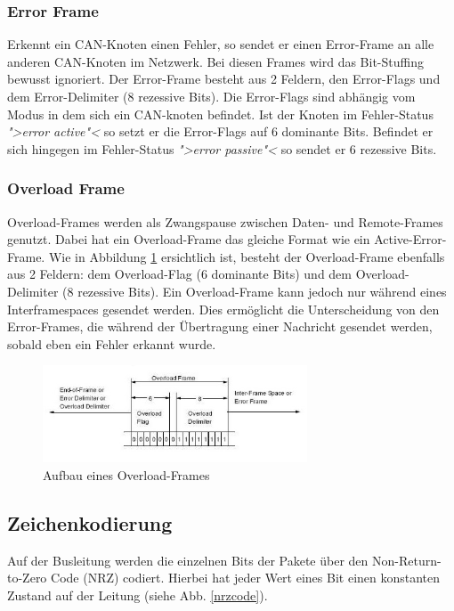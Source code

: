 \subsubsection{Error Frame} Erkennt ein CAN-Knoten einen Fehler, so
sendet er einen Error-Frame an alle anderen CAN-Knoten im Netzwerk.
Bei diesen Frames wird das Bit-Stuffing bewusst ignoriert. Der
Error-Frame besteht aus 2 Feldern, den Error-Flags und dem
Error-Delimiter (8 rezessive Bits). Die Error-Flags sind abhängig vom
Modus in dem sich ein CAN-knoten befindet. Ist der Knoten im
Fehler-Status \textit{">error active"<} so setzt er die Error-Flags
auf 6 dominante Bits. Befindet er sich hingegen im Fehler-Status
\textit{">error passive"<} so sendet er 6 rezessive Bits.
	
\subsubsection{Overload Frame} Overload-Frames werden als Zwangspause
zwischen Daten- und Remote-Frames genutzt. Dabei hat ein
Overload-Frame das gleiche Format wie ein Active-Error-Frame. Wie in
Abbildung \ref{overload} ersichtlich ist, besteht der Overload-Frame
ebenfalls aus 2 Feldern: dem Overload-Flag (6 dominante Bits) und dem
Overload-Delimiter (8 rezessive Bits). Ein Overload-Frame kann jedoch
nur während eines Interframespaces gesendet werden. Dies ermöglicht
die Unterscheidung von den Error-Frames, die während der Übertragung
einer Nachricht gesendet werden, sobald eben ein Fehler erkannt wurde.

	
\begin{figure}[h] 
\centering
\includegraphics[width=0.7\textwidth]{figures/overload-frame}
\caption{Aufbau eines Overload-Frames \citep{CBM}} 
\label{overload}
\end{figure} 
	
\subsection{Zeichenkodierung}
	
Auf der Busleitung werden die einzelnen Bits der Pakete über den 
Non-Return-to-Zero Code (NRZ) codiert. Hierbei hat jeder Wert eines Bit 
einen konstanten Zustand auf der Leitung (siehe Abb. \ref{nrzcode}).

